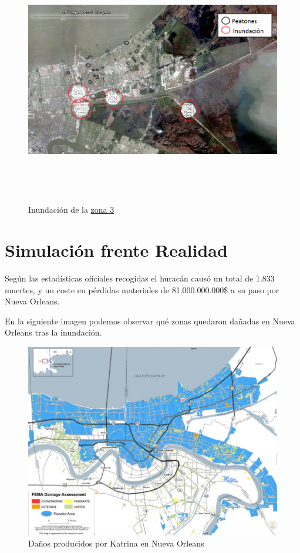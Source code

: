 \begin{figure}[H]
 \centering
 \includegraphics[height=110mm,angle=90]{figuras/cap6/resultados/katrina3.png}
 \caption{Inundación de la \hyperref[zona3]{zona 3}}
\end{figure}

\section{Simulación frente Realidad}

Según las estadísticas oficiales recogidas\cite{Blake07}\cite{Knabb05} el
huracán causó un total de 1.833 muertes, y un coste en pérdidas materiales de
81.000.000.000\$ a su paso por Nueva Orleans.

En la siguiente imagen podemos observar qué zonas quedaron dañadas en Nueva
Orleans tras la inundación\cite{Gabe05}.

\begin{figure}[H]
 \centering
 \includegraphics[width=135mm]{figuras/cap6/NOdamage.png}
 \caption{Daños producidos por Katrina en Nueva Orleans}
\end{figure}

